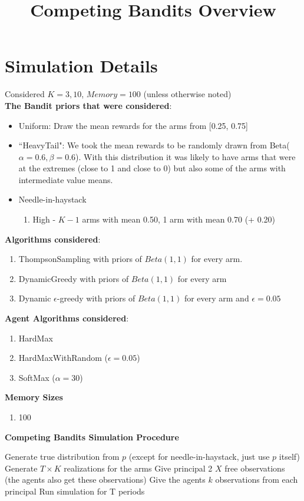\documentclass[11pt,letterpaper]{article}
\begin{document}
 

\title{Competing Bandits Overview}
\maketitle

\section*{Simulation Details}

Considered $K = 3, 10$, $Memory = 100$ (unless otherwise noted) \\
\textbf{The Bandit priors that were considered}:
\begin{itemize}
\item Uniform: Draw the mean rewards for the arms from [0.25, 0.75]
\item ``HeavyTail": We took the mean rewards to be randomly drawn from Beta($\alpha=0.6,\beta=0.6$). With this distribution it was likely to have arms that were at the extremes (close to 1 and close to 0) but also some of the arms with intermediate value means.
\item Needle-in-haystack
\begin{enumerate}
\item High - $K-1$ arms with mean 0.50, 1 arm with mean 0.70 (+ 0.20)
\end{enumerate}
\end{itemize}
\textbf{Algorithms considered}:
\begin{enumerate}
\item ThompsonSampling with priors of $Beta(1, 1)$ for every arm.
\item DynamicGreedy with priors of $Beta(1, 1)$ for every arm
\item Dynamic $\epsilon$-greedy with priors of $Beta(1, 1)$ for every arm and $\epsilon=0.05$
\end{enumerate}
\textbf{Agent Algorithms considered}:
\begin{enumerate}
\item HardMax
\item HardMaxWithRandom ($\epsilon = 0.05$)
\item SoftMax ($\alpha = 30$)
\end{enumerate}
\textbf{Memory Sizes}
\begin{enumerate}
\item 100
\end{enumerate}
\pagebreak
\textbf{Competing Bandits Simulation Procedure}
\begin{algorithm}
\begin{algorithmic}[1]
\State Generate true distribution from $p$ (except for needle-in-haystack, just use $p$ itself)
\State Generate $T \times K$ realizations for the arms 
				\State Give principal 2 $X$ free observations (the agents also get these observations)				
				\State Give the agents $k$ observations from each principal
				\State Run simulation for T periods
			\EndFor
		\EndFor
	\EndFor
\EndFor
\end{algorithmic}
\end{algorithm}
\end{document}
